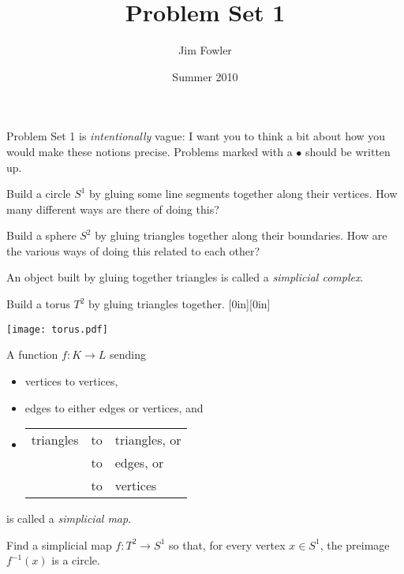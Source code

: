 \documentclass[12pt]{pset}
\title{Problem Set 1}
\author{Jim Fowler}
\date{Summer 2010}
\begin{document}
\maketitle

\noindent Problem Set 1 is \textit{intentionally} vague: I want you to think a
bit about how you would make these notions precise.  Problems
 marked with a $\bullet$ should be written up.

\vfill\begin{problem}
  Build a circle $S^1$ by gluing some line segments together
  along their vertices.  How many different ways are there of doing this?
\end{problem}

\vfill\begin{problem}
 Build a sphere $S^2$ by gluing triangles together along their
 boundaries.  How are the various ways of doing this related to each
 other?
\end{problem}

\vfill\begin{definition*}
An object built by gluing together triangles is called a
\textit{simplicial complex}.
\end{definition*}

\vfill\begin{problem}
Build a torus $T^2$ by gluing triangles together.\hfill%
\raisebox{2ex-\height}[0in][0in]{\parbox{0.25\textwidth}{\texttt{[image: torus.pdf]} \\ \null\hfill \raisebox{1ex}{a torus}\hfill\null}}
\end{problem}

\vfill\begin{definition*}
 A function $f : K \to L$ sending
\begin{itemize}
\item vertices to vertices,
\item edges to either edges or vertices, and
\item \begin{tabular}[t]{@{}l@{ }l@{ }l}
    triangles & to & triangles, or \\
    & to & edges, or \\
    & to & vertices
    \end{tabular}
\end{itemize}
is called a \textit{simplicial map}.
\end{definition*}

\vfill\begin{requiredproblem}
  Find a simplicial map $f : T^2 \to S^1$ so that, for every vertex $x \in
  S^1$, the preimage $f^{-1}(x)$ is a circle.
\end{requiredproblem}
\end{document}
